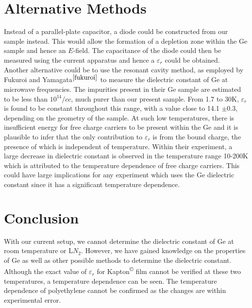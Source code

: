 \documentclass[a4paper,11pt]{article}
\begin{document}
		
\section{Alternative Methods}
\label{s:altMeth}

Instead of a parallel-plate capacitor, a diode could be constructed from our sample instead. This would allow the formation of a depletion zone within the Ge sample and hence an $E$-field. The capacitance of the diode could then be measured using the current apparatus and hence a $\varepsilon_{r}$ could be obtained. %
\\

Another alternative could be to use the resonant cavity method, as employed by Fukuroi and Yamagata$^{\cite{fukuroi}}$ to measure the dielectric constant of Ge at microwave frequencies. The impurities present in their Ge sample are estimated to be less than $10^{14}/cc$, much purer than our present sample. From 1.7 to 30K, $\varepsilon_{r}$ is found to be constant throughout this range, with a value close to 14.1 $\pm$0.3, depending on the geometry of the sample. At such low temperatures, there is insufficient energy for free charge carriers to be present within the Ge and it is plausible to infer that the only contribution to $\varepsilon_{r}$ is from the bound charge, the presence of which is independent of temperature. %
Within their experiment, a large decrease in dielectric constant is observed in the temperature range 10-200K which is attributed to the temperature dependence of free charge carriers. This could have large implications for any experiment which uses the Ge dielectric constant since it has a significant temperature dependence.





\section{Conclusion}
\label{s:conc}

With our current setup, we cannot determine the dielectric constant of Ge at room temperature or L$N_{2}$. However, we have gained knowledge on the properties of Ge as well as other possible methods to determine the dielectric constant. Although the exact value of $\varepsilon_{r}$ for Kapton\textsuperscript{\copyright} film cannot be verified at these two temperatures, a temperature dependence can be seen. The temperature dependence of polyethylene cannot be confirmed as the changes are within experimental error.
\end{document}
